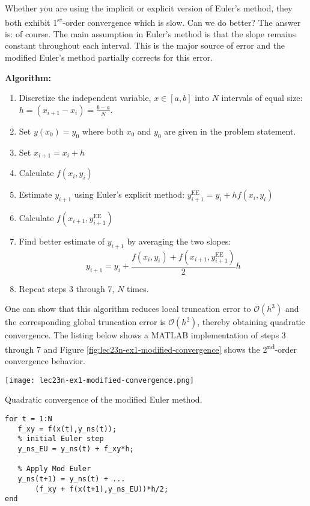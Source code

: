 Whether you are using the implicit or explicit version of Euler's method, they both exhibit 1\textsuperscript{st}-order convergence which is slow.  Can we do better?  The answer is: of course.  The main assumption in Euler's method is that the slope remains constant throughout each interval.  This is the major source of error and the modified Euler's method partially corrects for this error.

\vspace{0.2cm}

\noindent\textbf{Algorithm:}
\begin{enumerate}
\item Discretize the independent variable, $x \in [a,b]$ into $N$ intervals of equal size: $h = (x_{i+1}-x_i) = \frac{b-a}{N}$.
\item Set $y(x_0) = y_0$ where both $x_0$ and $y_0$ are given in the problem statement.
\item Set $x_{i+1} = x_i + h$
\item Calculate $f(x_i,y_i)$
\item Estimate $y_{i+1}$ using Euler's explicit method: $y^{\text{EE}}_{i+1} = y_i + hf(x_{i},y_{i})$
\item Calculate $f(x_{i+1},y^{\text{EE}}_{i+1})$
\item Find better estimate of $y_{i+1}$ by averaging the two slopes:
\begin{equation*}
y_{i+1} = y_i + \frac{f(x_i,y_i) + f(x_{i+1},y^{\text{EE}}_{i+1})}{2}h
\end{equation*}
\item Repeat steps 3 through 7, $N$ times.
\end{enumerate}
One can show that this algorithm reduces local truncation error to $\mathcal{O}(h^3)$ and the corresponding global truncation error is $\mathcal{O}(h^2)$, thereby obtaining quadratic convergence. The listing below shows a MATLAB implementation of steps 3 through 7 and Figure \ref{fig:lec23n-ex1-modified-convergence} shows the 2\textsuperscript{nd}-order convergence behavior.
\begin{marginfigure}
\texttt{[image: lec23n-ex1-modified-convergence.png]}
\caption{Quadratic convergence of the modified Euler method.}
\label{fig:lec23n-ex1-modified-convergence}
\end{marginfigure}
\begin{lstlisting}[style=myMatlab,name=lec23n-modified]
for t = 1:N
   f_xy = f(x(t),y_ns(t));
   % initial Euler step
   y_ns_EU = y_ns(t) + f_xy*h;
   
   % Apply Mod Euler
   y_ns(t+1) = y_ns(t) + ...
       (f_xy + f(x(t+1),y_ns_EU))*h/2;   
end
\end{lstlisting}








